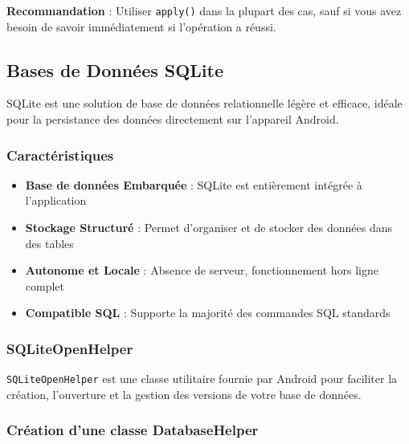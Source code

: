 \documentclass[11pt,a4paper]{article}
\begin{document}
\textbf{Recommandation} : Utiliser \texttt{apply()} dans la plupart des cas, sauf si vous avez besoin de savoir immédiatement si l'opération a réussi.

\subsection{Bases de Données SQLite}

SQLite est une solution de base de données relationnelle légère et efficace, idéale pour la persistance des données directement sur l'appareil Android.

\subsubsection{Caractéristiques}

\begin{itemize}
    \item \textbf{Base de données Embarquée} : SQLite est entièrement intégrée à l'application
    \item \textbf{Stockage Structuré} : Permet d'organiser et de stocker des données dans des tables
    \item \textbf{Autonome et Locale} : Absence de serveur, fonctionnement hors ligne complet
    \item \textbf{Compatible SQL} : Supporte la majorité des commandes SQL standards
\end{itemize}

\subsubsection{SQLiteOpenHelper}

\texttt{SQLiteOpenHelper} est une classe utilitaire fournie par Android pour faciliter la création, l'ouverture et la gestion des versions de votre base de données.

\subsubsection{Création d'une classe DatabaseHelper}
\end{document}
